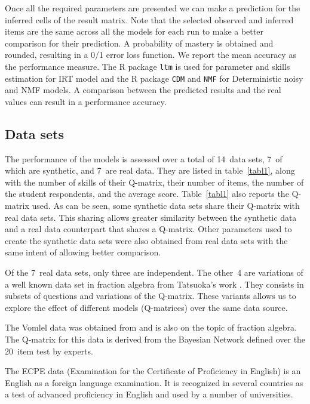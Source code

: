 Once all the required parameters are presented we can make a prediction for the inferred cells of the result matrix. Note that the selected observed and inferred items are the same across all the models for each run to make a better comparison for their prediction. A probability of mastery is obtained and rounded, resulting in a 0/1 error loss function.  We report the mean accuracy as the performance measure.  The R package \texttt{ltm} is used for parameter and skills estimation for IRT model and the R package \texttt{CDM} and \texttt{NMF} for Deterministic noisy and NMF models. A comparison between the predicted results and the real values can result in a performance accuracy. 


\subsection{Data sets}

The performance of the models is assessed over a total of 14~data sets, 7~of which are synthetic, and 7~are real data.  They are listed in table~\ref{tabl1}, along with the number of skills of their Q-matrix, their number of items, the number of the student respondents, and the average score.  Table~\ref{tabl1} also reports the Q-matrix used.  As can be seen, some synthetic data sets share their Q-matrix with real data sets.  This sharing allows greater similarity between the synthetic data and a real data counterpart that shares a Q-matrix.  Other parameters used to create the synthetic data sets were also obtained from real data sets with the same intent of allowing better comparison.  

Of the 7~real data sets, only three are independent.  The other~4 are variations of a well known data set in fraction algebra from Tatsuoka's work \citep{tatsuoka1984analysis}.  They consists in subsets of questions and variations of the Q-matrix.  These variants allows us to explore the effect of different models (Q-matrices) over the same data source.

The Vomlel data was obtained from \citep{vomlel:2004} and is also on the topic of fraction algebra.  The Q-matrix for this data is derived from the Bayesian Network defined over the 20~item test by experts.

The ECPE data (Examination for the Certificate of Proficiency in English) is an English as a foreign language examination. It is recognized in several countries as a test of advanced proficiency in English and used by a number of universities.

